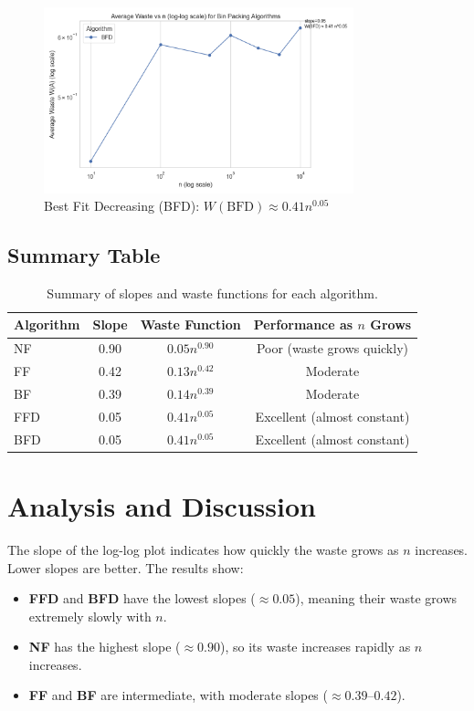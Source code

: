\documentclass[12pt]{article}
\begin{document}
\begin{figure}[h!]
    \centering
    \includegraphics[width=0.8\textwidth]{waste_loglog_BFD.png}
    \caption{Best Fit Decreasing (BFD): $W(\text{BFD}) \approx 0.41 n^{0.05}$}
\end{figure}

\clearpage

\subsection{Summary Table}
\begin{table}[h!]
    \centering
    \begin{tabular}{lccc}
        \toprule
        Algorithm & Slope & Waste Function & Performance as $n$ Grows \\
        \midrule
        NF  & 0.90 & $0.05 n^{0.90}$ & Poor (waste grows quickly) \\
        FF  & 0.42 & $0.13 n^{0.42}$ & Moderate \\
        BF  & 0.39 & $0.14 n^{0.39}$ & Moderate \\
        FFD & 0.05 & $0.41 n^{0.05}$ & Excellent (almost constant) \\
        BFD & 0.05 & $0.41 n^{0.05}$ & Excellent (almost constant) \\
        \bottomrule
    \end{tabular}
    \caption{Summary of slopes and waste functions for each algorithm.}
\end{table}

\section{Analysis and Discussion}

The slope of the log-log plot indicates how quickly the waste grows as $n$ increases. Lower slopes are better. The results show:
\begin{itemize}
    \item \textbf{FFD} and \textbf{BFD} have the lowest slopes ($\approx 0.05$), meaning their waste grows extremely slowly with $n$.
    \item \textbf{NF} has the highest slope ($\approx 0.90$), so its waste increases rapidly as $n$ increases.
    \item \textbf{FF} and \textbf{BF} are intermediate, with moderate slopes ($\approx 0.39$--$0.42$).
\end{itemize}
\end{document}
